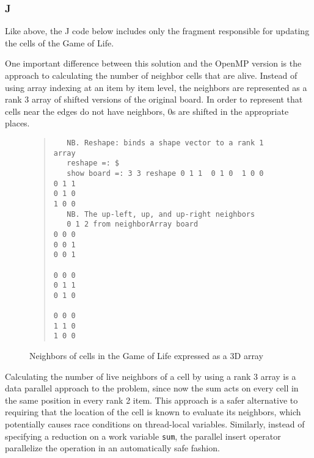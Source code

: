 \subsubsection{J}
Like above, the J code below includes only the fragment responsible for updating the cells of the Game of Life. 

\begin{singlespacing}
\begin{small}

\end{small}
\end{singlespacing}

\noindent One important difference between this solution and the OpenMP version is 
the approach to calculating the number of neighbor cells that are alive.
Instead of using array indexing at an item by item level, 
the neighbors are represented as a rank 3 array of shifted versions of the original board. 
In order to represent that cells near the edges do not have neighbors, 
0s are shifted in the appropriate places.

\begin{figure}
\begin{quote}
\begin{singlespacing}
\begin{small}
\begin{verbatim}
   NB. Reshape: binds a shape vector to a rank 1 array
   reshape =: $
   show board =: 3 3 reshape 0 1 1  0 1 0  1 0 0
0 1 1
0 1 0
1 0 0
   NB. The up-left, up, and up-right neighbors
   0 1 2 from neighborArray board 
0 0 0
0 0 1
0 0 1

0 0 0
0 1 1
0 1 0

0 0 0
1 1 0
1 0 0
\end{verbatim}
\end{small}
\end{singlespacing}
\end{quote}
\caption{Neighbors of cells in the Game of Life expressed as a 3D array}
\label{fig::gol_nei}
\end{figure}

Calculating the number of live neighbors of a cell by using a rank 3 array 
is a data parallel approach to the problem, since now the sum acts on every cell in the same position in every rank 2 item. 
This approach is a safer alternative to requiring 
that the location of the cell is known to evaluate its neighbors, 
which potentially causes race conditions on thread-local variables.
Similarly, instead of specifying a reduction on a work variable \texttt{sum},
the parallel insert operator parallelize the operation in an automatically safe fashion.

